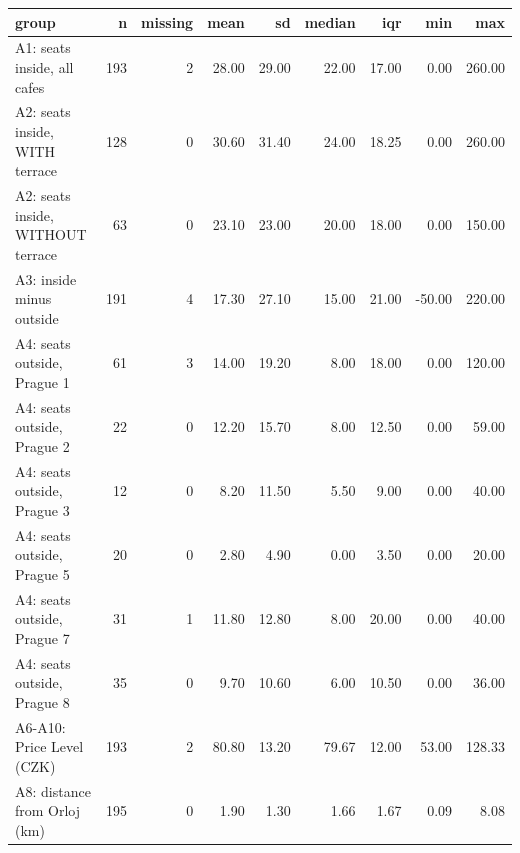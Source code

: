 \begin{tabular}{lrrrrrrrr}
  \toprule
group & n & missing & mean & sd & median & iqr & min & max \\ 
  \midrule
A1: seats inside, all cafes & 193 &   2 & 28.00 & 29.00 & 22.00 & 17.00 & 0.00 & 260.00 \\ 
  A2: seats inside, WITH terrace & 128 &   0 & 30.60 & 31.40 & 24.00 & 18.25 & 0.00 & 260.00 \\ 
  A2: seats inside, WITHOUT terrace &  63 &   0 & 23.10 & 23.00 & 20.00 & 18.00 & 0.00 & 150.00 \\ 
  A3: inside minus outside & 191 &   4 & 17.30 & 27.10 & 15.00 & 21.00 & -50.00 & 220.00 \\ 
  A4: seats outside, Prague 1 &  61 &   3 & 14.00 & 19.20 & 8.00 & 18.00 & 0.00 & 120.00 \\ 
  A4: seats outside, Prague 2 &  22 &   0 & 12.20 & 15.70 & 8.00 & 12.50 & 0.00 & 59.00 \\ 
  A4: seats outside, Prague 3 &  12 &   0 & 8.20 & 11.50 & 5.50 & 9.00 & 0.00 & 40.00 \\ 
  A4: seats outside, Prague 5 &  20 &   0 & 2.80 & 4.90 & 0.00 & 3.50 & 0.00 & 20.00 \\ 
  A4: seats outside, Prague 7 &  31 &   1 & 11.80 & 12.80 & 8.00 & 20.00 & 0.00 & 40.00 \\ 
  A4: seats outside, Prague 8 &  35 &   0 & 9.70 & 10.60 & 6.00 & 10.50 & 0.00 & 36.00 \\ 
  A6-A10: Price Level (CZK) & 193 &   2 & 80.80 & 13.20 & 79.67 & 12.00 & 53.00 & 128.33 \\ 
  A8: distance from Orloj (km) & 195 &   0 & 1.90 & 1.30 & 1.66 & 1.67 & 0.09 & 8.08 \\ 
   \bottomrule
\end{tabular}
